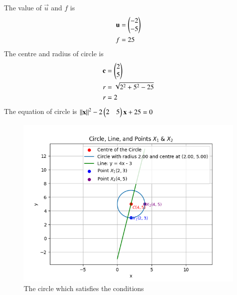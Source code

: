 \documentclass[journal]{IEEEtran}
\begin{document}
The value of $\vec{u}$ and $f$ is 
\begin{align}
\mathbf{u}&=\begin{pmatrix}-2\\-5\end{pmatrix}\\
f&=25
\end{align}
The centre and radius of circle is
\begin{align}
\mathbf{c}&=\begin{pmatrix}2\\5\end{pmatrix}\\
r&=\sqrt{2^2+5^2-25}\\
r&=2
\end{align}
The equation of circle is $\left\lVert\mathbf{x}\right\rVert^2-2\begin{pmatrix}2 & 5\end{pmatrix}\mathbf{x}+25=0$
\begin{figure}[h!]
   \centering
   \includegraphics[width = 1\linewidth]{figs/fig.png}
   \caption{The circle which satisfies the conditions}
   \label{stemplot}
\end{figure}
\end{document}
